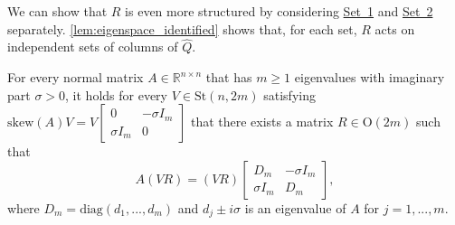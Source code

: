 \documentclass[10pt,twoside,dvipsnames]{siamart1116}
\numberwithin{algorithm}{section}
\numberwithin{equation}{section}
\newcommand{\wordref}[2]{\hyperlink{#1}{#2}}
\begin{document}
We can show that $R$ is even more structured by considering \wordref{set1}{Set~1} and \wordref{set2}{Set~2} separately. \cref{lem:eigenspace_identified} shows that, for each set, $R$ acts on independent sets of columns of $\widehat{Q}$. 
\begin{lemma}\label{lem:eigenspace_identified}
For every normal matrix $A\in\mathbb{R}^{n\times n}$ that has $m\geq 1$ eigenvalues with imaginary part $\sigma>0$, it holds for every $V\in\mathrm{St}(n,2m)$ satisfying $\mathrm{skew}(A)V=V\left[\begin{smallmatrix}0&-\sigma I_m\\ \sigma I_m &0\end{smallmatrix}\right]$ that there exists a matrix $R\in\mathrm{O}(2m)$ such that \begin{equation*}
	A(VR) = (VR)\begin{bmatrix}
	D_m&-\sigma I_m\\
	\sigma I_m& D_m
	\end{bmatrix},
	\end{equation*}
	where $D_m=\mathrm{diag}(d_1,...,d_m)$ and $d_j\pm i\sigma$ is an eigenvalue of $A$ for $j=1,...,m$.
	\end{lemma}
\end{document}
